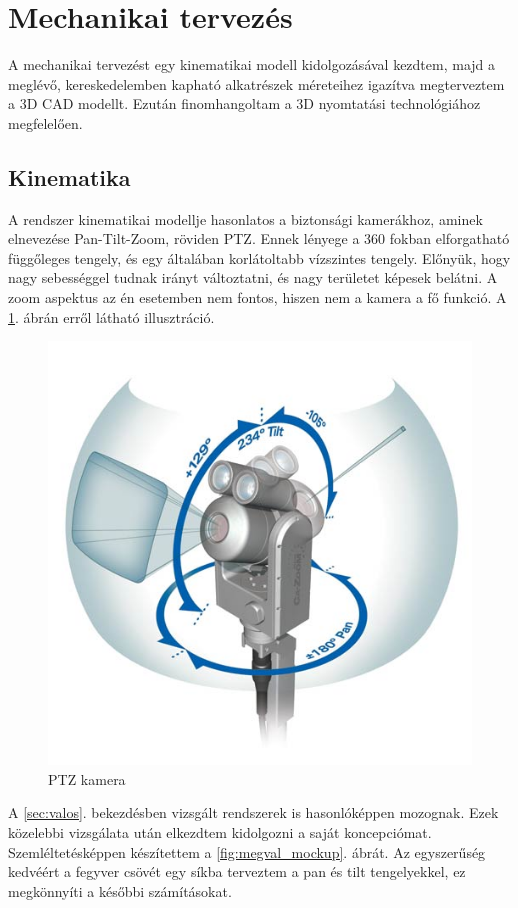 \documentclass[12pt,a4paper]{article}
\begin{document}
\pagebreak
\section{Mechanikai tervezés}
A mechanikai tervezést egy kinematikai modell kidolgozásával kezdtem, majd a meglévő, kereskedelemben kapható alkatrészek méreteihez igazítva megterveztem a 3D CAD modellt. Ezután finomhangoltam a 3D nyomtatási technológiához megfelelően.
\subsection{Kinematika}
A rendszer kinematikai modellje hasonlatos a biztonsági kamerákhoz, aminek elnevezése Pan-Tilt-Zoom, röviden PTZ. Ennek lényege a 360 fokban elforgatható függőleges tengely, és egy általában korlátoltabb vízszintes tengely. Előnyük, hogy nagy sebességgel tudnak irányt változtatni, és nagy területet képesek belátni. A zoom aspektus az én esetemben nem fontos, hiszen nem a kamera a fő funkció. A \ref{fig:mech_pantilt}. ábrán erről látható illusztráció.

\begin{figure}[h!]
	\centering
	\includegraphics[width=0.6\linewidth]{mech_pantilt}
	\caption{PTZ kamera}
	\label{fig:mech_pantilt}
\end{figure}

A \ref{sec:valos}. bekezdésben vizsgált rendszerek is hasonlóképpen mozognak. Ezek közelebbi vizsgálata után elkezdtem kidolgozni a saját koncepciómat. Szemléltetésképpen készítettem a \ref{fig:megval_mockup}. ábrát. Az egyszerűség kedvéért a fegyver csövét egy síkba terveztem a pan és tilt tengelyekkel, ez megkönnyíti a későbbi számításokat.
\end{document}

